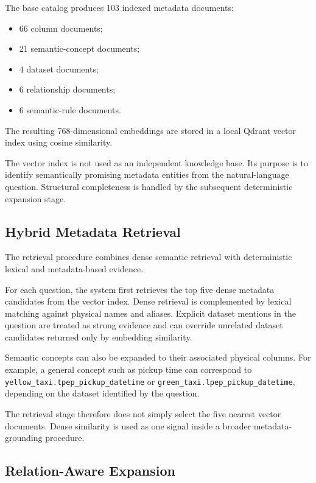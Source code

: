 The base catalog produces 103 indexed metadata documents:

\begin{itemize}

    \item 66 column documents;
    \item 21 semantic-concept documents;
    \item 4 dataset documents;
    \item 6 relationship documents;
    \item 6 semantic-rule documents.

\end{itemize}

The resulting 768-dimensional embeddings are stored in a local Qdrant vector
index using cosine similarity.

The vector index is not used as an independent knowledge base. Its purpose is
to identify semantically promising metadata entities from the natural-language
question. Structural completeness is handled by the subsequent deterministic
expansion stage.


\subsection{Hybrid Metadata Retrieval}

The retrieval procedure combines dense semantic retrieval with deterministic
lexical and metadata-based evidence.

For each question, the system first retrieves the top five dense metadata
candidates from the vector index. Dense retrieval is complemented by lexical
matching against physical names and aliases. Explicit dataset mentions in the
question are treated as strong evidence and can override unrelated dataset
candidates returned only by embedding similarity.

Semantic concepts can also be expanded to their associated physical columns.
For example, a general concept such as pickup time can correspond to
\texttt{yellow\_taxi.tpep\_pickup\_datetime} or
\texttt{green\_taxi.lpep\_pickup\_datetime}, depending on the dataset
identified by the question.

The retrieval stage therefore does not simply select the five nearest vector
documents. Dense similarity is used as one signal inside a broader
metadata-grounding procedure.


\subsection{Relation-Aware Expansion}


